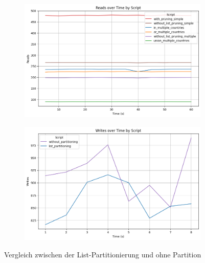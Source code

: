 \vspace{-8pt}
\begin{figure}[H]
	\centering
	\begin{subfigure}[t]{0.48\textwidth}
		\includegraphics[width=\textwidth]{PNGs/Script/Partition/list-partition/Reads}
	\end{subfigure}
	\hfill
	\begin{subfigure}[t]{0.48\textwidth}
		\includegraphics[width=\textwidth]{PNGs/Script/Partition/list-partition/Writes}
	\end{subfigure}
	\vspace{-8pt}
	\caption[List-Partitionierung: Unterschiedliche Abfragen mit und ohne Partition]{Vergleich zwischen der List-Partitionierung und ohne Partition}
	\label{fig:list-partition}
\end{figure}
\vspace{-19pt}

